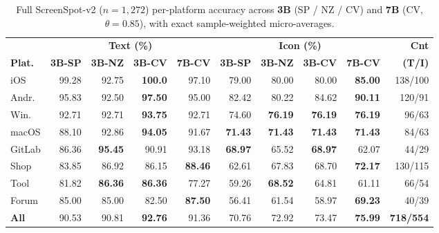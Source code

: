 \documentclass[10pt,twocolumn,letterpaper]{article}
\begin{document}
\begin{table}[t]
\centering
\caption{Full ScreenSpot-v2 ($n{=}1{,}272$) per-platform accuracy across \textbf{3B} (SP / NZ / CV) and \textbf{7B} (CV, $\theta{=}0.85$), with exact sample-weighted micro-averages.}
\label{tab:full1272}
\scriptsize
\setlength{\tabcolsep}{1.7pt}
\begin{tabular}{@{}lrrrrrrrrr@{}}
\toprule
& \multicolumn{4}{c}{\textbf{Text (\%)}} & \multicolumn{4}{c}{\textbf{Icon (\%)}} & \textbf{Cnt} \\
\cmidrule(lr){2-5} \cmidrule(lr){6-9}
\textbf{Plat.} & \textbf{3B-SP} & \textbf{3B-NZ} & \textbf{3B-CV} & \textbf{7B-CV} & \textbf{3B-SP} & \textbf{3B-NZ} & \textbf{3B-CV} & \textbf{7B-CV} & \textbf{(T/I)} \\
\midrule
iOS & 99.28 & 92.75 & \textbf{100.0} & 97.10 & 79.00 & 80.00 & 80.00 & \textbf{85.00} & 138/100 \\
Andr. & 95.83 & 92.50 & \textbf{97.50} & 95.00 & 82.42 & 80.22 & 84.62 & \textbf{90.11} & 120/91 \\
Win. & 92.71 & 92.71 & \textbf{93.75} & 92.71 & 74.60 & \textbf{76.19} & \textbf{76.19} & \textbf{76.19} & 96/63 \\
macOS & 88.10 & 92.86 & \textbf{94.05} & 91.67 & \textbf{71.43} & \textbf{71.43} & \textbf{71.43} & \textbf{71.43} & 84/63 \\
GitLab & 86.36 & \textbf{95.45} & 90.91 & 93.18 & \textbf{68.97} & 65.52 & \textbf{68.97} & 62.07 & 44/29 \\
Shop & 83.85 & 86.92 & 86.15 & \textbf{88.46} & 62.61 & 67.83 & 68.70 & \textbf{72.17} & 130/115 \\
Tool & 81.82 & \textbf{86.36} & \textbf{86.36} & 77.27 & 59.26 & \textbf{68.52} & 64.81 & 61.11 & 66/54 \\
Forum & 85.00 & 85.00 & 82.50 & \textbf{87.50} & 56.41 & 61.54 & 58.97 & \textbf{69.23} & 40/39 \\
\midrule
\rowcolor{rowhl}
\textbf{All} & 90.53 & 90.81 & \textbf{92.76} & 91.36 & 70.76 & 72.92 & 73.47 & \textbf{75.99} & \textbf{718/554} \\
\bottomrule
\end{tabular}
\end{table}

\end{document}
